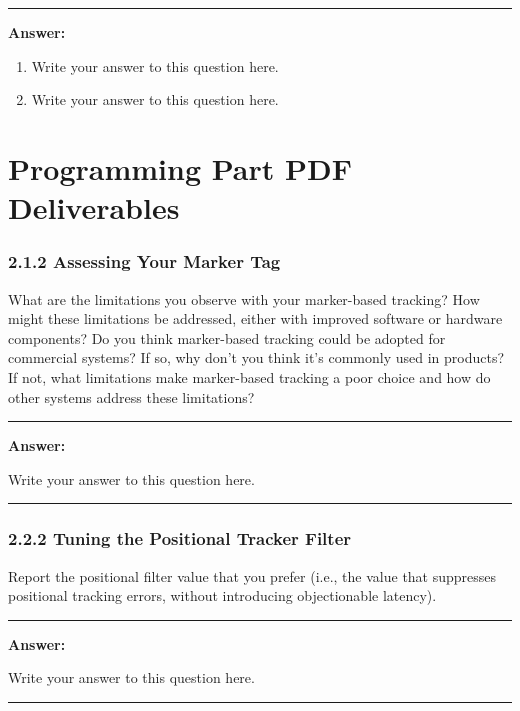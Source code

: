 \documentclass[conference]{styles/acmsiggraph}
\newenvironment{answer}{}{}
\begin{document}

\begin{answer}
\rule{\textwidth}{0.4pt}
\textbf{Answer:}

\begin{enumerate}[label=(\roman*)]
\item Write your answer to this question here.

\item Write your answer to this question here.
\end{enumerate}
\end{answer}


\newpage
\section*{Programming Part PDF Deliverables}
\subsubsection*{2.1.2 Assessing Your Marker Tag}
What are the limitations you observe with your marker-based tracking? How might these limitations be addressed, either with improved software or hardware components? Do you think marker-based tracking could be adopted for commercial systems? If so, why don't you think it's commonly used in products? If not, what limitations make marker-based tracking a poor choice and how do other systems address these limitations?

\begin{answer}
\rule{\textwidth}{0.4pt}
	
	\textbf{Answer:}
	
	Write your answer to this question here.

\rule{\textwidth}{0.4pt}
\end{answer}

\subsubsection*{2.2.2 Tuning the Positional Tracker Filter}
Report the positional filter value that you prefer (i.e., the value that suppresses positional tracking errors, without introducing objectionable latency).

\begin{answer}
\rule{\textwidth}{0.4pt}
	
	\textbf{Answer:}
	
	Write your answer to this question here.

\rule{\textwidth}{0.4pt}
\end{answer}
\end{document}
